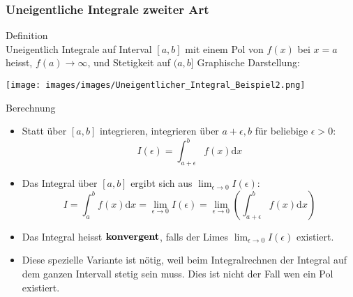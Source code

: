 \subsubsection{Uneigentliche Integrale zweiter Art}
	\begin{definition}{Definition}\\
		Uneigentlich Integrale auf Interval \([a,b]\) mit einem Pol von \(f(x)\) bei \(x=a\) heisst,
		\(f(a) \rightarrow \infty\), und Stetigkeit auf \((a,b]\)
		Graphische Darstellung:
	\begin{center}
		\texttt{[image: images/images/Uneigentlicher\_Integral\_Beispiel2.png]}
	\end{center}
  \end{definition}
  \begin{KR}{Berechnung}
	  \begin{itemize}
	  	
\item Statt über \([a,b]\) integrieren, integrieren über \(a+\epsilon,b\) für beliebige \(\epsilon>0\):
	\[I(\epsilon)=\int_{a+\epsilon}^b{f(x)\mathrm{d}x}\]
\item Das Integral über \([a,b]\) ergibt sich aus \(\lim_{\epsilon \rightarrow 0}I(\epsilon)\):
	\[I=\int_a^b{f(x)\mathrm{d}x}=\underset{\epsilon \rightarrow 0}{\lim}I(\epsilon)=\underset{\epsilon \rightarrow
	0}{\lim}\left(\int_{a+\epsilon}^b{f(x)\mathrm{d}x}\right) \]
\item Das Integral heisst \(\bold{konvergent}\), falls der Limes \(\lim_{\epsilon \rightarrow 0}I(\epsilon)\) existiert.
\item Diese spezielle Variante ist nötig, weil beim Integralrechnen der Integral auf dem ganzen Intervall stetig sein
	muss. Dies ist nicht der Fall wen ein Pol existiert.
\end{itemize}
  \end{KR}
